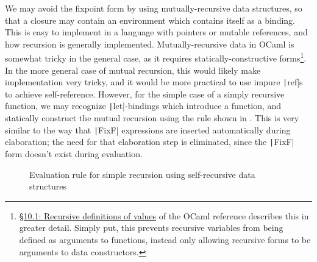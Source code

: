 We may avoid the fixpoint form by using mutually-recursive data structures, so that a closure may contain an environment which contains itself as a binding. This is easy to implement in a language with pointers or mutable references, and how recursion is generally implemented. Mutually-recursive data in OCaml is somewhat tricky in the general case, as it requires statically-constructive forms\footnote{\href{https://ocaml.org/manual/letrecvalues.html}{\S10.1: Recursive definitions of values} of the OCaml reference describes this in greater detail. Simply put, this prevents recursive variables from being defined as arguments to functions, instead only allowing recursive forms to be arguments to data constructors.}. In the more general case of mutual recursion, this would likely make implementation very tricky, and it would be more practical to use impure \texttt|ref|s to achieve self-reference. However, for the simple case of a simply recursive function, we may recognize \texttt|let|-bindings which introduce a function, and statically construct the mutual recursion using the rule shown in . This is very similar to the way that \texttt|FixF| expressions are inserted automatically during elaboration; the need for that elaboration step is eliminated, since the \texttt|FixF| form doesn't exist during evaluation.


\begin{figure}
  \centering
  \begin{singlespace}
    \begin{mathpar}
    \end{mathpar}
  \end{singlespace}
  \caption{Evaluation rule for simple recursion using self-recursive data structures}
  \label{fig:rec-closures-let}
\end{figure}

